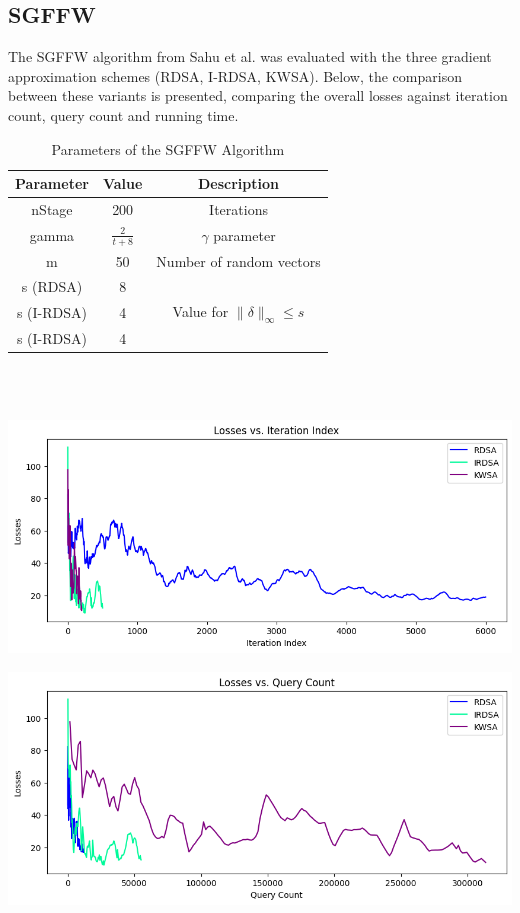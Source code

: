 \documentclass[10pt,twocolumn,letterpaper]{article}
\begin{document}
\subsection{SGFFW}

The SGFFW algorithm from Sahu et al.\cite{Sahu} was evaluated with the three
gradient approximation schemes (RDSA, I-RDSA, KWSA).
Below, the comparison between these variants is presented,
comparing the overall losses against iteration count, query count and running time.


\begin{table}[h]
   \centering
   \begin{tabular}{ccc}
       \hline
       \textbf{Parameter} & \textbf{Value} & \textbf{Description} \\
       \hline
       nStage & 200 & Iterations\\
       \hline
       gamma & $\frac{2}{t+8}$ & $\gamma$ parameter \\
       \hline
       m & 50 & Number of random vectors\\
       \hline
       s (RDSA) & 8 & \\
       s (I-RDSA) & 4 & Value for $\|\delta\|_{\infty} \leq s$ \\
       s (I-RDSA) & 4 & \\
       \hline
   \end{tabular}\\
   \
   \caption{Parameters of the SGFFW Algorithm} 
   \label{tab:sgffw_params}
\end{table}


\begin{center}
   \includegraphics*[scale=0.35]{img/SGFFW_loss_vs_iterations.png}
\end{center}

\begin{center}
   \includegraphics*[scale=0.35]{img/SGFFW_loss_vs_querycount.png}
\end{center}
\end{document}
